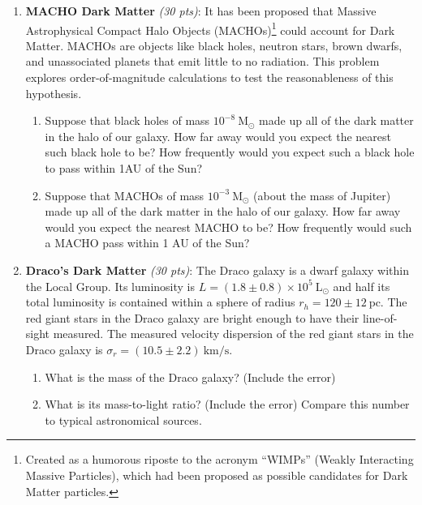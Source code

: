 \documentclass[12pt,preprint]{aastex}
\def\pc{\mathrm{pc}}
\def\km{\mathrm{km}}
\def\s{\mathrm{s}}
\def\Msol{\mathrm{M_\odot}}
\def\Lsol{\mathrm{L_\odot}}
\newcommand\sn[2]{#1 \times 10^{#2}}
\begin{document}
\begin{enumerate}
\item \textbf{MACHO Dark Matter} \textit{(30 pts)}: It has been proposed that Massive Astrophysical Compact Halo Objects (MACHOs)\footnote{Created as a humorous riposte to the acronym ``WIMPs'' (Weakly Interacting Massive Particles), which had been proposed as possible candidates for Dark Matter particles.} could account for Dark Matter. MACHOs are objects like black holes, neutron stars, brown dwarfs, and unassociated planets that emit little to no radiation. This problem explores order-of-magnitude calculations to test the reasonableness of this hypothesis.
	\begin{enumerate}
	\item Suppose that black holes of mass $10^{-8}\ \Msol$ made up all of the dark matter in the halo of our galaxy. How far away would you expect the nearest such black hole to be? How frequently would you expect such a black hole to pass within 1AU of the Sun?
	\item Suppose that MACHOs of mass $10^{-3}\ \Msol$ (about the mass of Jupiter) made up all of the dark matter in the halo of our galaxy. How far away would you expect the nearest MACHO to be? How frequently would such a MACHO pass within 1 AU of the Sun? 
	\end{enumerate}

\item \textbf{Draco's Dark Matter} \textit{(30 pts)}: The Draco galaxy is a dwarf galaxy within the Local Group. Its luminosity is $L = \sn{(1.8 \pm 0.8)}{5}\ \Lsol$ and half its total luminosity is contained within a sphere of radius $r_h = 120 \pm 12\ \pc$. The red giant stars in the Draco galaxy are bright enough to have their line-of-sight measured. The measured velocity dispersion of the red giant stars in the Draco galaxy is $\sigma_r = (10.5 \pm 2.2)\ \km/\s$. 
	\begin{enumerate}
	\item What is the mass of the Draco galaxy? (Include the error)
	\item What is its mass-to-light ratio? (Include the error) Compare this number to typical astronomical sources.
	\end{enumerate}

\end{enumerate}
\end{document}
